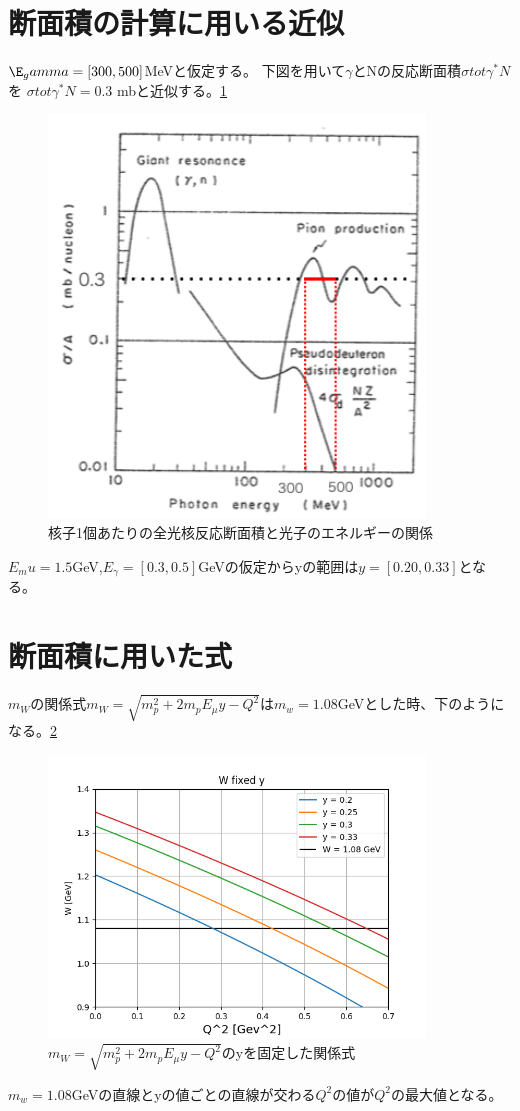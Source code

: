 \section{断面積の計算に用いる近似}
$\E_gamma = [300, 500]$MeVと仮定する。
下図を用いて$\gamma$とNの反応断面積$\sigma{tot}\gamma^* N$を
$\sigma{tot}\gamma^* N = 0.3$ mbと近似する。\ref*{fig:test5}
\begin{figure}[H]
    \centering
    \includegraphics[width=10cm]{img/sigma_tot.png}
    \caption{核子1個あたりの全光核反応断面積と光子のエネルギーの関係}
    \label{fig:test5}
\end{figure}

$E_mu = 1.5$GeV,$E_\gamma = [0.3, 0.5]$GeVの仮定からyの範囲は$y = [0.20, 0.33]$となる。


\section{断面積に用いた式}
$m_W$の関係式$m_W = \sqrt{m_p^2 + 2m_pE_\mu y - Q^2}$は$m_w = 1.08$GeVとした時、下のようになる。\ref{fig:test6}

\begin{figure}[H]
    \centering
    \includegraphics[width=10cm]{img/W2_fixed_y.png}
    \caption{$m_W = \sqrt{m_p^2 + 2m_pE_\mu y - Q^2}$のyを固定した関係式}
    \label{fig:test6}
\end{figure}

$m_w = 1.08$GeVの直線とyの値ごとの直線が交わる$Q^2$の値が$Q^2$の最大値となる。